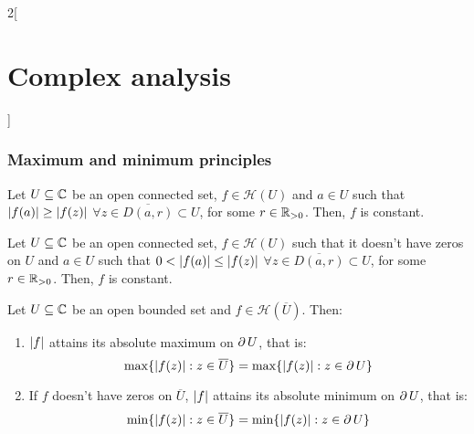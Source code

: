 \documentclass[../../../main.tex]{subfiles}
\begin{document}
\begin{multicols}{2}[\section{Complex analysis}]
  \subsubsection{Maximum and minimum principles}
  \begin{theorem}
    Let $U\subseteq\mathbb{C}$ be an open connected set, $f\in\mathcal{H}(U)$ and $a\in U$ such that $\abs{f(a)}\geq \abs{f(z)}$ $\forall z\in \overline{D(a,r)}\subset U$, for some $r\in\mathbb{R}_{>0}$. Then, $f$ is constant.
  \end{theorem}
  \begin{corollary}
    Let $U\subseteq\mathbb{C}$ be an open connected set, $f\in\mathcal{H}(U)$ such that it doesn't have zeros on $U$ and $a\in U$ such that $0<\abs{f(a)}\leq \abs{f(z)}$ $\forall z\in \overline{D(a,r)}\subset U$, for some $r\in\mathbb{R}_{>0}$. Then, $f$ is constant.
  \end{corollary}
  \begin{corollary}
    Let $U\subseteq\mathbb{C}$ be an open bounded set and $f\in\mathcal{H}(\overline{U})$. Then:
    \begin{enumerate}
      \item $\abs{f}$ attains its absolute maximum on $\operatorname{\partial}{U}$, that is: $$\max\{\abs{f(z)}:z\in\overline{U}\}=\max\{\abs{f(z)}:z\in\operatorname{\partial} U\}$$
      \item If $f$ doesn't have zeros on $\overline{U}$, $\abs{f}$ attains its absolute minimum on $\operatorname{\partial}{U}$, that is: $$\min\{\abs{f(z)}:z\in\overline{U}\}=\min\{\abs{f(z)}:z\in\operatorname{\partial} U\}$$
    \end{enumerate}
  \end{corollary}

\end{multicols}
\end{document}

